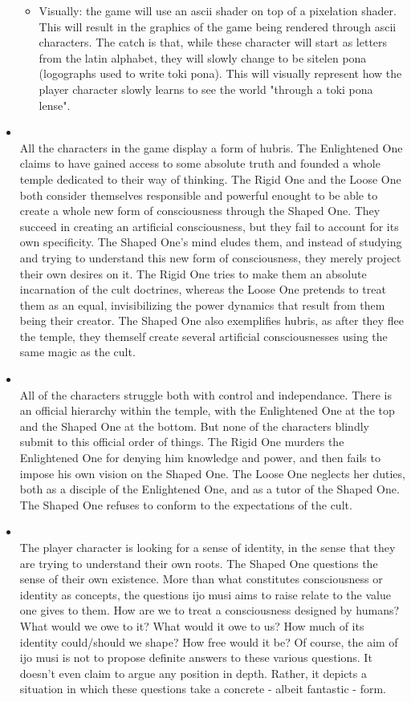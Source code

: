\documentclass{scrartcl}
\let\emph\relax %
\begin{document}
\begin{itemize}
\begin{itemize}
						\item Visually: 
							the game will use an ascii shader on top of a pixelation shader. This will result in the graphics of the game being rendered through ascii characters. The catch is that, while these character will start as letters from the latin alphabet, they will slowly change to be sitelen pona (logographs used to write toki pona). This will visually represent how the player character slowly learns to see the world "through a toki pona lense".
					\end{itemize}		
				\item \emph{Hubris}\\
					All the characters in the game display a form of hubris. The Enlightened One claims to have gained access to some absolute truth and founded a whole temple dedicated to their way of thinking. The Rigid One and the Loose One both consider themselves responsible and powerful enought to be able to create a whole new form of consciousness through the Shaped One. They succeed in creating an artificial consciousness, but they fail to account for its own specificity. The Shaped One's mind eludes them, and instead of studying and trying to understand this new form of consciousness, they merely project their own desires on it. The Rigid One tries to make them an absolute incarnation of the cult doctrines, whereas the Loose One pretends to treat them as an equal, invisibilizing the power dynamics that result from them being their creator. The Shaped One also exemplifies hubris, as after they flee the temple, they themself create several artificial consciousnesses using the same magic as the cult.
				\item \emph{Control and independance}\\
					All of the characters struggle both with control and independance. There is an official hierarchy within the temple, with the Enlightened One at the top and the Shaped One at the bottom. But none of the characters blindly submit to this official order of things. The Rigid One murders the Enlightened One for denying him knowledge and power, and then fails to impose his own vision on the Shaped One. The Loose One neglects her duties, both as a disciple of the Enlightened One, and as a tutor of the Shaped One. The Shaped One refuses to conform to the expectations of the cult.
				\item \emph{Consciousness and identity}\\
					The player character is looking for a sense of identity, in the sense that they are trying to understand their own roots. The Shaped One questions the sense of their own existence. More than what constitutes consciousness or identity as concepts, the questions ijo musi aims to raise relate to the value one gives to them. How are we to treat a consciousness designed by humans? What would we owe to it? What would it owe to us? How much of its identity could/should we shape? How free would it be? Of course, the aim of ijo musi is not to propose definite answers to these various questions. It doesn't even claim to argue any position in depth. Rather, it depicts a situation in which these questions take a concrete - albeit fantastic - form.
			\end{itemize}
\end{document}
